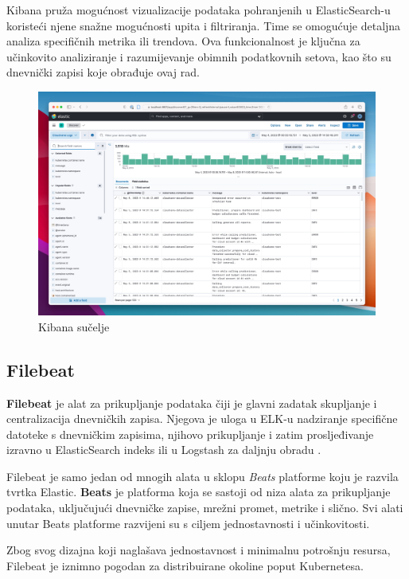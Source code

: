 \documentclass[times, utf8, diplomski]{fer}
\begin{document}
Kibana pruža mogućnost vizualizacije podataka pohranjenih u ElasticSearch-u koristeći njene snažne mogućnosti upita i filtriranja. Time se omogućuje detaljna analiza specifičnih metrika ili trendova. Ova funkcionalnost je ključna za učinkovito analiziranje i razumijevanje obimnih podatkovnih setova, kao što su dnevnički zapisi koje obrađuje ovaj rad.

\begin{figure}[htb]
	\centering
	\includegraphics[width=15cm]{images/elastic-logs.jpeg}
	\caption[Kibana sučelje]{Kibana sučelje}
	\label{fig:kibana}
\end{figure}

\subsection{Filebeat}
\label{sec:filebeat}

\textbf{Filebeat} je alat za prikupljanje podataka čiji je glavni zadatak skupljanje i centralizacija dnevničkih zapisa. Njegova je uloga u ELK-u nadziranje specifične datoteke s dnevničkim zapisima, njihovo prikupljanje i zatim prosljeđivanje izravno u ElasticSearch indeks ili u Logstash za daljnju obradu \citep{konda_elasticsearch_2023}. 

Filebeat je samo jedan od mnogih alata u sklopu \emph{Beats} platforme koju je razvila tvrtka Elastic. \textbf{Beats} je platforma koja se sastoji od niza alata za prikupljanje podataka, uključujući dnevničke zapise, mrežni promet, metrike i slično. Svi alati unutar Beats platforme razvijeni su s ciljem jednostavnosti i učinkovitosti. 

Zbog svog dizajna koji naglašava jednostavnost i minimalnu potrošnju resursa, Filebeat je iznimno pogodan za distribuirane okoline poput Kubernetesa.\\
\end{document}
